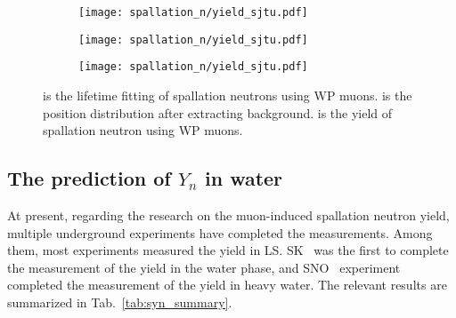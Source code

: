 \begin{figure}[htbp]
	\centering
	\begin{subfigure}{0.5\textwidth}
		\centering
		\texttt{[image: spallation\_n/yield\_sjtu.pdf]}
		\caption{}
		\label{fig:yield_sjtu8}
	\end{subfigure}%
	\begin{subfigure}{0.5\textwidth}
		\centering
		\texttt{[image: spallation\_n/yield\_sjtu.pdf]}
		\caption{}
		\label{fig:yield_sjtu11}
	\end{subfigure}
	\begin{subfigure}{0.5\textwidth}
		\centering
		\texttt{[image: spallation\_n/yield\_sjtu.pdf]}
		\caption{}
		\label{fig:yield_sjtu22}
	\end{subfigure}
	\caption{ is the lifetime fitting of spallation neutrons using WP muons.  is the position distribution after extracting background.  is the yield of spallation neutron using WP muons.}
	\label{fig:yield_sjtu_yield}
\end{figure}

\subsection{The prediction of $Y_n$ in water}
At present, regarding the research on the muon-induced spallation neutron yield, multiple underground experiments have completed the measurements. Among them, most experiments measured the yield in LS. SK~\cite{SK_spnYn} was the first to complete the measurement of the yield in the water phase, and SNO~\cite{sno_spnYn} experiment completed the measurement of the yield in heavy water. The relevant results are summarized in Tab.~\ref{tab:syn_summary}.

